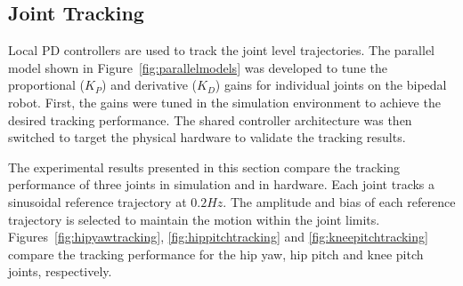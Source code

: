 \subsection{Joint Tracking} %
\label{sub:joint_tracking}
Local PD controllers are used to track the joint level trajectories. The parallel model shown in Figure~\ref{fig:parallelmodels} was developed to tune the proportional ($K_P$) and derivative ($K_D$) gains for individual joints on the bipedal robot. First, the gains were tuned in the simulation environment to achieve the desired tracking performance. The shared controller architecture was then switched to target the physical hardware to validate the tracking results. 

The experimental results presented in this section compare the tracking performance of three joints in simulation and in hardware. Each joint tracks a sinusoidal reference trajectory at $0.2 Hz$. The amplitude and bias of each reference trajectory is selected to maintain the motion within the joint limits. Figures~\ref{fig:hipyawtracking}, \ref{fig:hippitchtracking} and \ref{fig:kneepitchtracking} compare the tracking performance for the hip yaw, hip pitch and knee pitch joints, respectively. 

